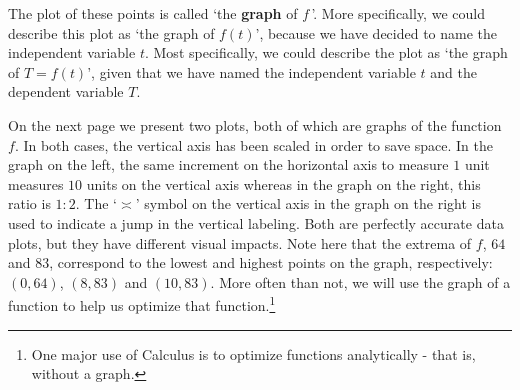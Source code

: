 \documentclass{ximera}
\begin{document}
 

The plot of these points is called `the \textbf{graph} of $f\,$'.  More specifically, we could describe this plot as `the graph of $f(t)$', because we have decided to name the independent variable $t$.  Most specifically, we could describe the plot as `the graph of $T = f(t)$', given that we have named the independent variable $t$ and the dependent variable $T$.  

 

On the next page we present two plots, both of which are graphs of the function $f$.  In both cases, the vertical axis has been scaled in order to save space.  In the graph on the left, the same increment on the horizontal axis to measure $1$ unit measures $10$ units on the vertical axis whereas in the graph on the right, this ratio is $1 : 2$.  The `$\asymp$' symbol on the vertical axis in the graph on the right is used to indicate a jump in the vertical labeling.  Both are perfectly accurate data plots, but they have different visual impacts.    Note here that the extrema of $f$, $64$ and $83$, correspond to the lowest and highest points on the graph, respectively:  $(0, 64)$, $(8, 83)$ and $(10,83)$.  More often than not, we will use the graph of a function to help us optimize that function.\footnote{One major use of Calculus is to optimize functions analytically - that is, without a graph.}

 



\end{document}
